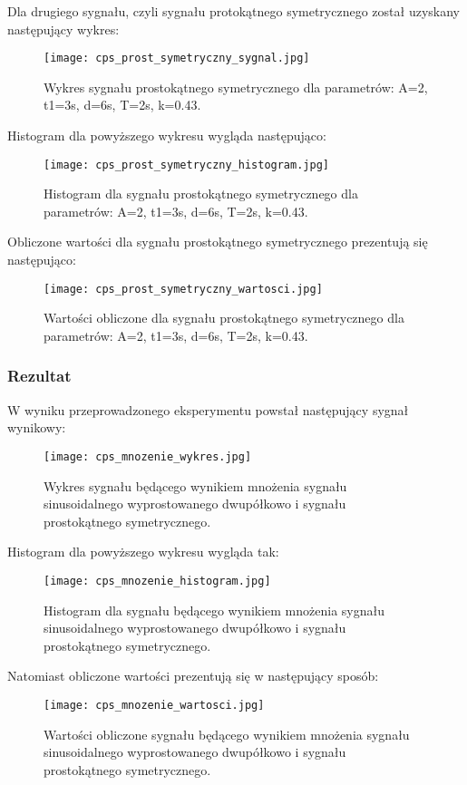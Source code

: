 \documentclass[12pt]{article}
\begin{document}
Dla drugiego sygnału, czyli sygnału protokątnego symetrycznego został uzyskany następujący wykres:
\begin{figure}[H]
    \centering
    \texttt{[image: cps\_prost\_symetryczny\_sygnal.jpg]}
    \caption{Wykres sygnału prostokątnego symetrycznego dla parametrów:  A=2, t1=3s, d=6s, T=2s, k=0.43.}
    \label{Histogram dla sygnału prostokątnego symetrycznego}
\end{figure}

Histogram dla powyższego wykresu wygląda następująco:
\begin{figure}[H]
    \centering
    \texttt{[image: cps\_prost\_symetryczny\_histogram.jpg]}
    \caption{Histogram dla sygnału prostokątnego symetrycznego dla parametrów:  A=2, t1=3s, d=6s, T=2s, k=0.43.}
    \label{Wykres dla sygnału prostokątnego symetrycznego}
\end{figure}

Obliczone wartości dla sygnału prostokątnego symetrycznego prezentują się następująco:
\begin{figure}[H]
    \centering
    \texttt{[image: cps\_prost\_symetryczny\_wartosci.jpg]}
    \caption{Wartości obliczone dla sygnału prostokątnego symetrycznego dla parametrów:  A=2, t1=3s, d=6s, T=2s, k=0.43.}
    \label{Wartości dla sygnału prostokątnego symetrycznego}
\end{figure}
\subsubsection{Rezultat}
W wyniku przeprowadzonego eksperymentu powstał następujący sygnał wynikowy:
\begin{figure}[H]
    \centering
    \texttt{[image: cps\_mnozenie\_wykres.jpg]}
    \caption{Wykres sygnału będącego wynikiem mnożenia sygnału sinusoidalnego wyprostowanego dwupółkowo i sygnału prostokątnego symetrycznego.}
    \label{Wykres dla mnożenia}
\end{figure}

Histogram dla powyższego wykresu wygląda tak:
\begin{figure}[H]
    \centering
    \texttt{[image: cps\_mnozenie\_histogram.jpg]}
    \caption{Histogram dla sygnału będącego wynikiem mnożenia sygnału sinusoidalnego wyprostowanego dwupółkowo i sygnału prostokątnego symetrycznego.}
    \label{Histogram dla mnożenia}
\end{figure}

Natomiast obliczone wartości prezentują się w następujący sposób:
\begin{figure}[H]
    \centering
    \texttt{[image: cps\_mnozenie\_wartosci.jpg]}
    \caption{Wartości obliczone sygnału będącego wynikiem mnożenia sygnału sinusoidalnego wyprostowanego dwupółkowo i sygnału prostokątnego symetrycznego.}
    \label{Wartości dla mnożenia}
\end{figure}
\end{document}
